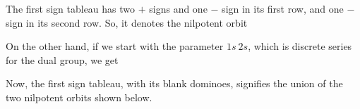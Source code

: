 \documentclass[12pt]{article}
\newcommand{\eps}{.06}
\newcommand{\teps}{\eps * 2}
\newcommand{\filledSquare}[3]{\filldraw [dominoStyle] (#2 - 1 + \eps, #1 - 1 + \eps) rectangle + (1 - \teps, 1 -\teps) node [tileText] {$#3$};}
\newcommand{\filledSquareShift}[4]{\filldraw [dominoStyle] (#2 - 1 + #4 + \eps, #1 - 1 + \eps) rectangle + (1 - \teps, 1 -\teps) node [tileText] {$#3$};}
\newcommand{\horizontalDomino}[3]{\filldraw [dominoStyle] (#2 - 1 + \eps, #1 - 1 + \eps) rectangle + (2 - \teps, 1 -\teps) node [dominoText] {$#3$};}
\newcommand{\verticalDomino}[3]{\filldraw [dominoStyle] (#2 - 1 + \eps,  #1 - 1 + \eps) rectangle + (1 - \teps,2 -\teps) node [dominoText] {$#3$};}
\newcommand{\horizontalDominoShift}[4]{\filldraw [dominoStyle] (#2 - 1 + #4 + \eps, #1 - 1 + \eps) rectangle + (2 - \teps, 1 -\teps) node [dominoText] {$#3$};}
\newcommand{\verticalDominoShift}[4]{\filldraw [dominoStyle] (#2 - 1 + #4 + \eps,  #1 - 1 + \eps) rectangle + (1 - \teps,2 -\teps) node [dominoText] {$#3$};}
\newcommand{\horizontalGridLine}[3]{\draw [gridLine] (#1, #2) -- + (#3,0);}
\newcommand{\verticalGridLine}[2]{\draw [gridLine] (#1, 0) -- + (0,#2);}
\newcommand{\fixedSquare}[2]{\filldraw [fixedSquareStyle] (#1,#2) rectangle +(1,1);}
\newcommand{\gridLines}[2] {
  \pgfmathsetmacro{\verticalEnd}{2 * #1}
  \pgfmathsetmacro{\horizontalEnd}{2 * #2}
  \foreach \vertical in {0,...,#2} {
    \pgfmathsetmacro{\var} {2 * \vertical}
    \verticalGridLine{\var}{\verticalEnd}
  }
  \foreach \horizontal in {0,...,#1} {
    \pgfmathsetmacro{\var} {2 * \horizontal}
    \horizontalGridLine{0}{\var}{\horizontalEnd}
  }
}
\newcommand{\gridLinesShift}[3] {
  \pgfmathsetmacro{\verticalEnd}{2 * #1}
  \pgfmathsetmacro{\horizontalEnd}{2 * #2}
  \foreach \vertical in {0,...,#2} {
    \pgfmathsetmacro{\var} {2 * \vertical + #3}
    \verticalGridLine{\var}{\verticalEnd}
  }
  \foreach \horizontal in {0,...,#1} {
    \pgfmathsetmacro{\var} {2 * \horizontal}
    \horizontalGridLine{#3}{\var}{\horizontalEnd}
  }
}
\newcommand{\fixedSquaresStart}[4]{
  \foreach \row in {#1,...,#2} {
    \foreach \column in {#3,...,#4} {
      \pgfmathsetmacro{\var}{\row + \column}
      \ifodd \var
      \else
        \fixedSquare\column\row
      \fi
    }
  }
}
\newcommand{\fixedSquares}[2]{
  \foreach \row in {0,...,#1} {
    \foreach \column in {0,...,#2} {
      \pgfmathsetmacro{\var}{\row + \column}
      \ifodd \var
        \fixedSquare\column\row
      \fi
    }
  }
}
\newcommand{\fixedSquaresForGrid}[2] {
  \pgfmathsetmacro{\rowParameter}{#1 * 2 - 1}
  \pgfmathsetmacro{\columnParameter}{#2 * 2 - 1}
  \fixedSquares{\rowParameter}{\columnParameter}
}
\newcommand{\fixedSquaresForGridShift}[3] {
  \pgfmathsetmacro{\rowParameter}{#1 * 2 - 1}
  \pgfmathsetmacro{\columnStart}{#3}
  \pgfmathsetmacro{\columnEnd}{#2 * 2 - 1 + #3}
  \fixedSquaresStart{0}{\rowParameter}{\columnStart}{\columnEnd}
}
\newcommand{\fixedSquaresStartAlt}[4]{
  \foreach \row in {#1,...,#2} {
    \foreach \column in {#3,...,#4} {
      \pgfmathsetmacro{\var}{\row + \column + 1}
      \ifodd \var
      \else
        \fixedSquare\column\row
      \fi
    }
  }
}
\newcommand{\fixedSquaresForGridShiftAlt}[3] {
  \pgfmathsetmacro{\rowParameter}{#1 * 2 - 1}
  \pgfmathsetmacro{\columnStart}{#3}
  \pgfmathsetmacro{\columnEnd}{#2 * 2 - 1 + #3}
  \fixedSquaresStartAlt{0}{\rowParameter}{\columnStart}{\columnEnd}
}
\begin{document}
  The first sign tableau has two $+$ signs and one $-$ sign in its first row, and one $-$ sign in its second row.
  So, it denotes the nilpotent orbit
  \begin{figure}[H]
    \centering
  \end{figure}

  On the other hand, if we start with the parameter $1s\ 2s$, which is discrete series for the dual group, we get
  \begin{figure}[H]
    \centering
  \end{figure}
  Now, the first sign tableau, with its blank dominoes, signifies the union of the two nilpotent orbits shown below.
  \begin{figure}[H]
    \centering
  \end{figure}
\end{document}

